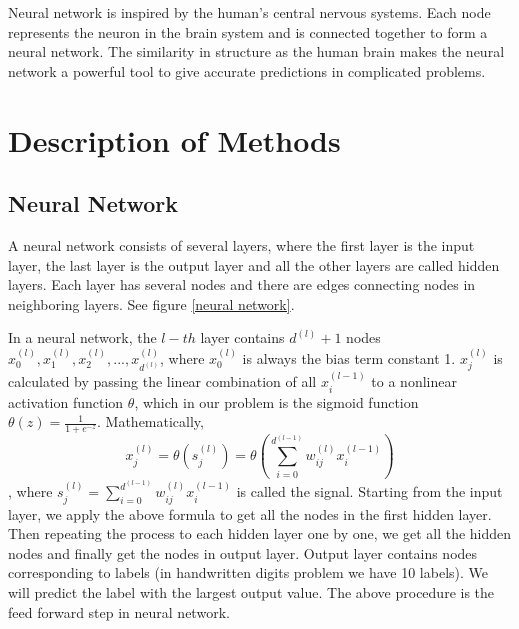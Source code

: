 \documentclass[11pt,letterpaper]{article}
\begin{document}
Neural network is inspired by the human’s central nervous systems. Each node represents the neuron in the brain system and is connected together to form a neural network.  The similarity in structure as the human brain makes the neural network a powerful tool to give accurate predictions in complicated problems. 



\section{Description of Methods}
\subsection{Neural Network}

A neural network consists of several layers, where the first layer is the input layer, the last layer is the output layer and all the other layers are called hidden layers. Each layer has several nodes and there are edges connecting nodes in neighboring layers. See figure \ref{neural network}.

In a neural network, the $l-th$ layer contains $d^{(l)}+1$ nodes $x_0^{(l)},x_1^{(l)},x_2^{(l)},...,x_{d^{(l)}}^{(l)}$, where $x_0^{(l)}$ is always the bias term constant 1. $x_j^{(l)}$ is calculated by passing the linear combination of all $x_i^{(l-1)}$ to a nonlinear activation function $\theta$, which in our problem is the sigmoid function $\theta(z)=\frac{1}{1+e^{-z}}$. Mathematically,
$$x_j^{(l)}=\theta(s_j^{(l)})=\theta\left(\sum_{i=0}^{d^{(l-1)}}w_{ij}^{(l)}x_i^{(l-1)}\right)$$,
where $s_j^{(l)}=\sum_{i=0}^{d^{(l-1)}}w_{ij}^{(l)}x_i^{(l-1)}$ is called the signal. Starting from the input layer, we apply the above formula to get all the nodes in the first hidden layer. Then repeating the process to each hidden layer one by one, we get all the hidden nodes and finally get the nodes in output layer. Output layer contains nodes corresponding to labels (in handwritten digits problem we have 10 labels). We will predict the label with the largest output value. The above procedure is the feed forward step in neural network. 
\end{document}
